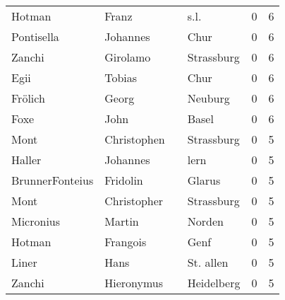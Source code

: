 \documentclass[10pt,a4paper,landscape]{article}
\begin{document}
\begin{longtable}{llllrr}
                   Hotman &                              Franz &             &                                        s.l. &          0 &         6 \\
               Pontisella &                           Johannes &             &                                        Chur &          0 &         6 \\
                   Zanchi &                           Girolamo &             &                                  Strassburg &          0 &         6 \\
                     Egii &                             Tobias &             &                                        Chur &          0 &         6 \\
                  Frölich &                              Georg &             &                                     Neuburg &          0 &         6 \\
                     Foxe &                               John &             &                                       Basel &          0 &         6 \\
                     Mont &                        Christophen &             &                                  Strassburg &          0 &         5 \\
                   Haller &                           Johannes &             &                                        lern &          0 &         5 \\
          BrunnerFonteius &                           Fridolin &             &                                      Glarus &          0 &         5 \\
                     Mont &                        Christopher &             &                                  Strassburg &          0 &         5 \\
                Micronius &                             Martin &             &                                      Norden &          0 &         5 \\
                   Hotman &                           Frangois &             &                                        Genf &          0 &         5 \\
                    Liner &                               Hans &             &                                   St. allen &          0 &         5 \\
                   Zanchi &                         Hieronymus &             &                                  Heidelberg &          0 &         5 \\

\end{longtable}
\end{document}
